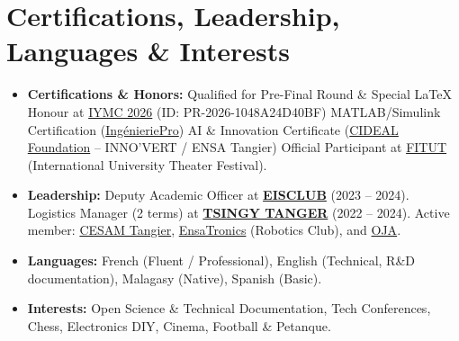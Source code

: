 \documentclass[10pt, a4paper]{article}
\begin{document}
\section*{Certifications, Leadership, Languages \& Interests}
\begin{itemize}[leftmargin=*, itemsep=0.3ex, parsep=0pt]
	\item \textbf{Certifications \& Honors:} Qualified for Pre-Final Round \& Special LaTeX Honour at \href{https://iymc.info/verify}{IYMC 2026} (ID: PR-2026-1048A24D40BF) \textbar{} MATLAB/Simulink Certification (\href{https://web.facebook.com/profile.php?id=61567878936369}{Ing\'{e}nieriePro}) \textbar{} AI \& Innovation Certificate (\href{http://cidealmaroc.org/}{CIDEAL Foundation} -- INNO'VERT / ENSA Tangier) \textbar{} Official Participant at \href{https://www.fitut.ma/}{FITUT} (International University Theater Festival).
	\item \textbf{Leadership:} Deputy Academic Officer at \href{https://www.linkedin.com/company/eisclubuae/home/}{\textbf{EISCLUB}} (2023 -- 2024). Logistics Manager (2 terms) at \href{https://tsingymaroc.org/}{\textbf{TSINGY TANGER}} (2022 -- 2024). Active member: \href{https://cesamcentrale.org/category/sections-cesam/tanger/}{CESAM Tangier}, \href{https://www.instagram.com/ensatronics/}{EnsaTronics} (Robotics Club), and \href{https://www.ojafricains.org/}{OJA}.
	\item \textbf{Languages:} French (Fluent / Professional), English (Technical, R\&D documentation), Malagasy (Native), Spanish (Basic).
	\item \textbf{Interests:} Open Science \& Technical Documentation, Tech Conferences, Chess, Electronics DIY, Cinema, Football \& Petanque.
\end{itemize}
\end{document}
